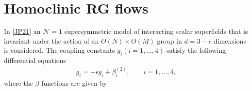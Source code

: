 \documentclass[letterpaper,10pt,english]{jupyterBook}
\begin{document}
\chapter{Homoclinic RG flows}
\label{\detokenize{HomoclinicRGflows:homoclinic-rg-flows}}\label{\detokenize{HomoclinicRGflows::doc}}
\sphinxAtStartPar
In {[}\hyperlink{cite.references:id23}{JP21}{]} an \(\mathcal{N}=1\) supersymmetric model of interacting
scalar superfields that is invariant under the action of an
\(O(N) \times O(M)\) group in \(d=3-\epsilon\) dimensions is considered.
The coupling constants \(g_i(i=1,\dots,4)\) satisfy the following differential equations
\begin{equation*}
\begin{split}
\dot g_i = -\epsilon g_i + \beta_i^{(2)}, \qquad i=1,\dots,4,
\end{split}
\end{equation*}
\sphinxAtStartPar
where the \(\beta\) functions are given by
\end{document}
